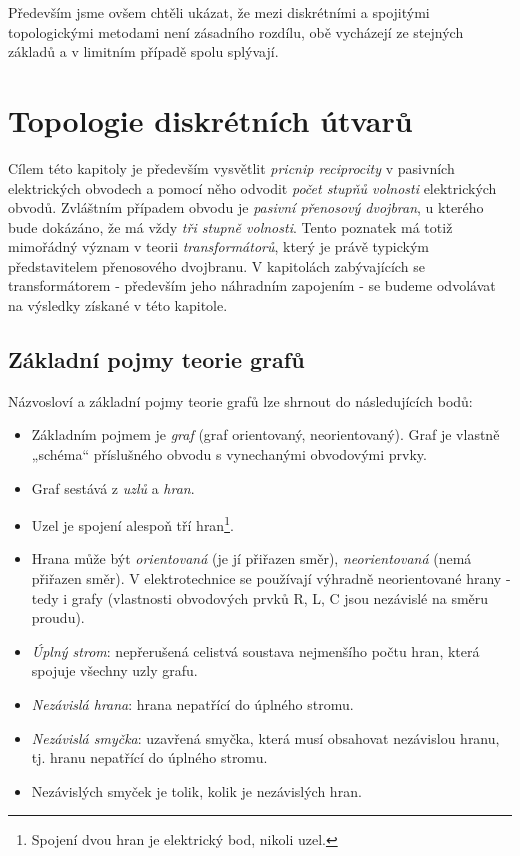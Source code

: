   Především jsme ovšem chtěli ukázat, že mezi diskrétními a spojitými topologickými metodami není
  zásadního rozdílu, obě vycházejí ze stejných základů a v limitním případě spolu splývají. 
  
  \section{Topologie diskrétních útvarů}\label{teo:IchapIIsecI}
    Cílem této kapitoly je především vysvětlit \emph{pricnip reciprocity} v pasivních elektrických
    obvodech a pomocí něho odvodit \emph{počet stupňů volnosti} elektrických obvodů. Zvláštním
    případem obvodu je \emph{pasivní přenosový dvojbran}, u kterého bude dokázáno, že má vždy
    \emph{tři stupně volnosti}. Tento poznatek má totiž mimořádný význam v teorii
    \emph{transformátorů}, který je právě typickým představitelem přenosového dvojbranu. V
    kapitolách zabývajících se transformátorem - především jeho náhradním zapojením - se budeme
    odvolávat na výsledky získané v této kapitole. 
    
    \subsection{Základní pojmy teorie grafů}\label{teo:IchapIIsecIsubI}
      Názvosloví a základní pojmy teorie grafů lze shrnout do následujících bodů:
      \begin{itemize}\addtolength{\itemsep}{-0.5\baselineskip}
        \item Základním pojmem je \emph{graf} (graf orientovaný, neorientovaný). Graf je vlastně
              „schéma“ příslušného obvodu s vynechanými obvodovými prvky.
        \item Graf sestává z \emph{uzlů} a \emph{hran}.
        \item Uzel je spojení alespoň tří hran\footnote{Spojení dvou hran je elektrický bod, 
              nikoli uzel.}.
        \item Hrana může být \emph{orientovaná} (je jí přiřazen směr), \emph{neorientovaná} (nemá
              přiřazen směr). V elektrotechnice se používají výhradně neorientované hrany - tedy i
              grafy (vlastnosti obvodových prvků R, L, C jsou nezávislé na směru proudu).
        \item \emph{Úplný strom}: nepřerušená celistvá soustava nejmenšího počtu hran, která spojuje
              všechny uzly grafu.
        \item \emph{Nezávislá hrana}: hrana nepatřící do úplného stromu.
        \item \emph{Nezávislá smyčka}: uzavřená smyčka, která musí obsahovat nezávislou hranu, tj.
              hranu nepatřící do úplného stromu.
        \item Nezávislých smyček je tolik, kolik je nezávislých hran.
      \end{itemize}
     
